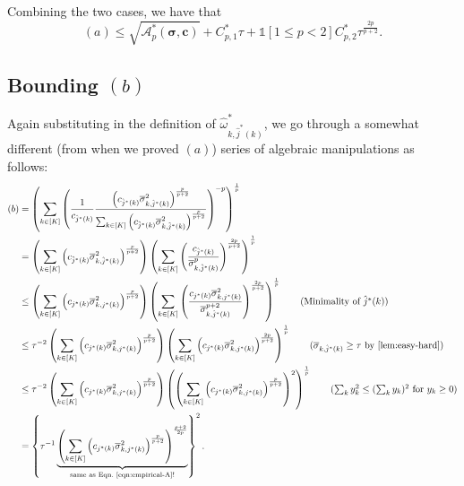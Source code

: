 \documentclass{article}
\def\vc{{\bm{c}}}
\def\gA{{\mathcal{A}}}
\theoremstyle{plain}
\theoremstyle{definition}
\theoremstyle{plain}
\newcommand{\indicator}{\mathds{1}}
\begin{document}
Combining the two cases, we have that
\begin{equation}
    (a) \leq \sqrt{\gA_p^*(\bm\sigma, \vc)} + C_{p,1}^* \tau + \indicator[1 \leq p < 2] C_{p,2}^* \tau^{\frac{2p}{p+2}}.
\end{equation}


\subsection{\texorpdfstring{Bounding $(b)$}{Bounding (b)}}
Again substituting in the definition of $\widehat{\omega}_{k,\hat{j}^*(k)}^*$, we go through a somewhat different (from when we proved $(a)$) series of algebraic manipulations as follows:
\begin{align}
    (b) &= \left( \sum_{k \in [K]} \left( \frac{1}{c_{\hat{j}^*(k)}} \frac{\left( c_{\hat{j}^*(k)} \overline{\sigma}_{k,\hat{j}^*(k)}^2 \right)^{\frac{p}{p+2}}}{\sum_{k\in[K]} \left( c_{\hat{j}^*(k)} \overline{\sigma}_{k,\hat{j}^*(k)}^2 \right)^{\frac{p}{p+2}}} \right)^{-p} \right)^{\frac{1}{p}} \\
    &= \left( \sum_{k\in[K]} \left( c_{\hat{j}^*(k)} \overline{\sigma}_{k,\hat{j}^*(k)}^2 \right)^{\frac{p}{p+2}} \right)
    \left( \sum_{k \in [K]} \left( \frac{c_{\hat{j}^*(k)}}{\overline{\sigma}_{k,\hat{j}^*(k)}^p} \right)^{\frac{2p}{p+2}} \right)^{\frac{1}{p}} \\
    &\leq \left( \sum_{k\in[K]} \left( c_{j^*(k)} \overline{\sigma}_{k,j^*(k)}^2 \right)^{\frac{p}{p+2}} \right)
    \left( \sum_{k \in [K]} \left( \frac{c_{j^*(k)} \overline{\sigma}_{k,j^*(k)}^2}{\overline{\sigma}_{k,\hat{j}^*(k)}^{p+2}} \right)^{\frac{2p}{p+2}} \right)^{\frac{1}{p}} \tag{Minimality of $\hat{j}^*(k)$} \\
    &\leq \tau^{-2} \left( \sum_{k\in[K]} \left( c_{j^*(k)} \overline{\sigma}_{k,j^*(k)}^2 \right)^{\frac{p}{p+2}} \right)
    \left( \sum_{k \in [K]} \left( c_{j^*(k)} \overline{\sigma}_{k,j^*(k)}^2 \right)^{\frac{2p}{p+2}} \right)^{\frac{1}{p}} \tag{$\overline{\sigma}_{k,\hat{j}^*(k)} \geq \tau$ by \Cref{lem:easy-hard}} \\
    &\leq \tau^{-2} \left( \sum_{k\in[K]} \left( c_{j^*(k)} \overline{\sigma}_{k,j^*(k)}^2 \right)^{\frac{p}{p+2}} \right)
    \left( \left( \sum_{k \in [K]} \left( c_{j^*(k)} \overline{\sigma}_{k,j^*(k)}^2 \right)^{\frac{p}{p+2}} \right)^2 \right)^{\frac{1}{p}} \tag{$\sum_k y_k^2 \leq (\sum_k y_k)^2$ for $y_k \geq 0$} \\
    &= \left\{ \tau^{-1} \underbrace{\left( \sum_{k\in[K]} \left( c_{j^*(k)} \overline{\sigma}_{k,j^*(k)}^2 \right)^{\frac{p}{p+2}} \right)^{\frac{p+2}{2p}}}_{\text{same as Eqn.~\eqref{eqn:empirical-A}!}} \right\}^2.
\end{align}
\end{document}
